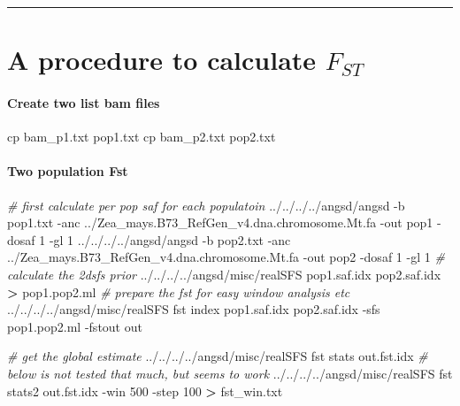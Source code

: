 \documentclass[]{article}
\newenvironment{Shaded}{\begin{snugshade}}{\end{snugshade}}
\newcommand{\CommentTok}[1]{\textcolor[rgb]{0.56,0.35,0.01}{\textit{#1}}}
\newcommand{\ExtensionTok}[1]{#1}
\newcommand{\FunctionTok}[1]{\textcolor[rgb]{0.00,0.00,0.00}{#1}}
\newcommand{\NormalTok}[1]{#1}
\newcommand{\OperatorTok}[1]{\textcolor[rgb]{0.81,0.36,0.00}{\textbf{#1}}}
\let\oldparagraph\paragraph
\renewcommand{\paragraph}[1]{\oldparagraph{#1}\mbox{}}
\begin{document}
\begin{center}\rule{0.5\linewidth}{0.5pt}\end{center}

\hypertarget{a-procedure-to-calculate-f_st}{%
\section{\texorpdfstring{A procedure to calculate
\(F_{ST}\)}{A procedure to calculate F\_\{ST\}}}\label{a-procedure-to-calculate-f_st}}

\hypertarget{create-two-list-bam-files}{%
\paragraph{Create two list bam files}\label{create-two-list-bam-files}}

\begin{Shaded}
\begin{Highlighting}[]
\FunctionTok{cp}\NormalTok{ bam_p1.txt pop1.txt}
\FunctionTok{cp}\NormalTok{ bam_p2.txt pop2.txt}
\end{Highlighting}
\end{Shaded}

\hypertarget{two-population-fst}{%
\paragraph{Two population Fst}\label{two-population-fst}}

\begin{Shaded}
\begin{Highlighting}[]
\CommentTok{# first calculate per pop saf for each populatoin}
\ExtensionTok{../../../../angsd/angsd}\NormalTok{ -b pop1.txt -anc ../Zea_mays.B73_RefGen_v4.dna.chromosome.Mt.fa -out pop1 -dosaf 1 -gl 1}
\ExtensionTok{../../../../angsd/angsd}\NormalTok{ -b pop2.txt -anc ../Zea_mays.B73_RefGen_v4.dna.chromosome.Mt.fa -out pop2 -dosaf 1 -gl 1}
\CommentTok{# calculate the 2dsfs prior}
\ExtensionTok{../../../../angsd/misc/realSFS}\NormalTok{ pop1.saf.idx pop2.saf.idx }\OperatorTok{>}\NormalTok{ pop1.pop2.ml}
\CommentTok{# prepare the fst for easy window analysis etc}
\ExtensionTok{../../../../angsd/misc/realSFS}\NormalTok{ fst index pop1.saf.idx pop2.saf.idx -sfs pop1.pop2.ml -fstout out}

\CommentTok{# get the global estimate}
\ExtensionTok{../../../../angsd/misc/realSFS}\NormalTok{ fst stats out.fst.idx}
\CommentTok{# below is not tested that much, but seems to work}
\ExtensionTok{../../../../angsd/misc/realSFS}\NormalTok{ fst stats2 out.fst.idx -win 500 -step 100 }\OperatorTok{>}\NormalTok{ fst_win.txt}
\end{Highlighting}
\end{Shaded}
\end{document}
